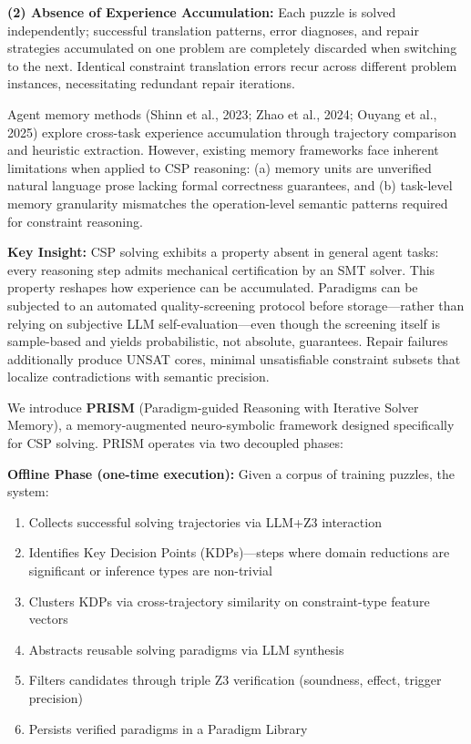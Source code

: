 \textbf{(2) Absence of Experience Accumulation:} Each puzzle is solved independently; successful translation patterns, error diagnoses, and repair strategies accumulated on one problem are completely discarded when switching to the next. Identical constraint translation errors recur across different problem instances, necessitating redundant repair iterations.

Agent memory methods (Shinn et al., 2023; Zhao et al., 2024; Ouyang et al., 2025) explore cross-task experience accumulation through trajectory comparison and heuristic extraction. However, existing memory frameworks face inherent limitations when applied to CSP reasoning: (a) memory units are unverified natural language prose lacking formal correctness guarantees, and (b) task-level memory granularity mismatches the operation-level semantic patterns required for constraint reasoning.

\textbf{Key Insight:} CSP solving exhibits a property absent in general agent tasks: every reasoning step admits mechanical certification by an SMT solver. This property reshapes how experience can be accumulated. Paradigms can be subjected to an automated quality-screening protocol before storage—rather than relying on subjective LLM self-evaluation—even though the screening itself is sample-based and yields probabilistic, not absolute, guarantees. Repair failures additionally produce UNSAT cores, minimal unsatisfiable constraint subsets that localize contradictions with semantic precision.

We introduce \textbf{PRISM} (Paradigm-guided Reasoning with Iterative Solver Memory), a memory-augmented neuro-symbolic framework designed specifically for CSP solving. PRISM operates via two decoupled phases:

\textbf{Offline Phase (one-time execution):} Given a corpus of training puzzles, the system:
\begin{enumerate}
    \item Collects successful solving trajectories via LLM+Z3 interaction
    \item Identifies Key Decision Points (KDPs)—steps where domain reductions are significant or inference types are non-trivial
    \item Clusters KDPs via cross-trajectory similarity on constraint-type feature vectors
    \item Abstracts reusable solving paradigms via LLM synthesis
    \item Filters candidates through triple Z3 verification (soundness, effect, trigger precision)
    \item Persists verified paradigms in a Paradigm Library
\end{enumerate}


